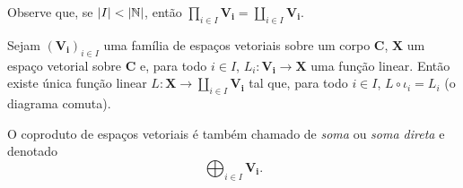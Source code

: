 Observe que, se $\left\vert{I}\right\vert < \left\vert{\mathbb{N}}\right\vert$, então $\prod_{i \in I} \bm{V_i} = \coprod_{i \in I} \bm{V_i}$.

\begin{prop}
Sejam $(\bm{V_i})_{i \in I}$ uma família de espaços vetoriais sobre um corpo $\bm C$, $\bm X$ um espaço vetorial sobre $\bm C$ e, para todo $i \in I$, $L_i: \bm{V_i} \to \bm X$ uma função linear. Então existe única função linear $L: \bm X \to \coprod_{i \in I} \bm{V_i}$ tal que, para todo $i \in I$, $L \circ \iota_i = L_i$ (o diagrama comuta).
\begin{figure}
\centering
{}
\end{figure}
\end{prop}

O coproduto de espaços vetoriais é também chamado de \emph{soma} ou \emph{soma direta} e denotado
	\begin{equation*}
	\bigoplus_{i \in I} \bm{V_i}.
	\end{equation*}



%
%
%
%

